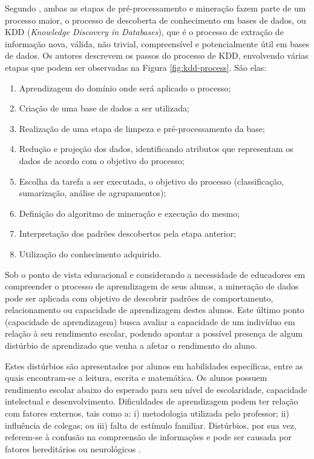 Segundo , ambas as etapas de pré\hyp{}processamento e mineração fazem parte de um processo maior, o processo de descoberta de conhecimento em bases de dados, ou KDD (\textit{Knowledge Discovery in Databases}), que é o processo de extração de informação nova, válida, não trivial, compreensível e potencialmente útil em bases de dados. Os autores descrevem os passos do processo de KDD, envolvendo várias etapas que podem ser observadas na Figura \ref{fig:kdd-process}. São elas: 

\begin{enumerate}[label=\roman*.]
    \item Aprendizagem do domínio onde será aplicado o processo;
    \item Criação de uma base de dados a ser utilizada;
    \item Realização de uma etapa de limpeza e pré\hyp{}processamento da base;
    \item Redução e projeção dos dados, identificando atributos que representam os dados de acordo com o objetivo do processo;
    \item Escolha da tarefa a ser executada, o objetivo do processo (classificação, sumarização, análise de agrupamentos);
    \item Definição do algoritmo de mineração e execução do mesmo;
    \item Interpretação dos padrões descobertos pela etapa anterior;
    \item Utilização do conhecimento adquirido.
\end{enumerate}

Sob o ponto de vista educacional e considerando a necessidade de educadores em compreender o processo de aprendizagem de seus alunos, a mineração de dados pode ser aplicada com objetivo de descobrir padrões de comportamento, relacionamento ou capacidade de aprendizagem destes alunos. Este último ponto (capacidade de aprendizagem) busca avaliar a capacidade de um indivíduo em relação à seu rendimento escolar, podendo apontar a possível presença de algum distúrbio de aprendizado que venha a afetar o rendimento do aluno.

Estes distúrbios são apresentados por alunos em habilidades específicas, entre as quais encontram-se a leitura, escrita e matemática. Os alunos possuem rendimento escolar abaixo do esperado para seu nível de escolaridade, capacidade intelectual e desenvolvimento. Dificuldades de aprendizagem podem ter relação com fatores externos, tais como a: i) metodologia utilizada pelo professor; ii) influência de colegas; ou iii) falta de estímulo familiar. Distúrbios, por sua vez, referem-se à confusão na compreensão de informações e pode ser causada por fatores hereditários ou neurológicos \cite{porto2005bases,silva2014disturbios}.

